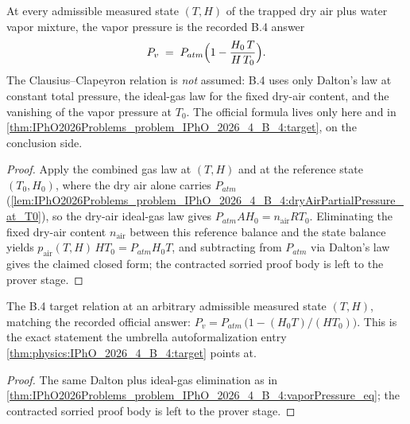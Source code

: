 \begin{theorem}
\label{thm:IPhO2026Problems_problem_IPhO_2026_4_B_4:vaporPressure_eq}
At every admissible measured state $(T, H)$ of the trapped dry air plus
water vapor mixture, the vapor pressure is the recorded B.4 answer
\[ P_v \;=\; P_{atm}\Bigl(1 - \frac{H_0\,T}{H\,T_0}\Bigr). \]
The Clausius--Clapeyron relation is \emph{not} assumed: B.4 uses only
Dalton's law at constant total pressure, the ideal-gas law for the fixed
dry-air content, and the vanishing of the vapor pressure at $T_0$.  The
official formula lives only here and in
\cref{thm:IPhO2026Problems_problem_IPhO_2026_4_B_4:target}, on the
conclusion side.
\end{theorem}
\begin{proof}
Apply the combined gas law at $(T, H)$ and at the reference state
$(T_0, H_0)$, where the dry air alone carries $P_{atm}$
(\cref{lem:IPhO2026Problems_problem_IPhO_2026_4_B_4:dryAirPartialPressure_at_T0}),
so the dry-air ideal-gas law gives
$P_{atm} A H_0 = n_{\mathrm{air}} R T_0$.  Eliminating the fixed dry-air
content $n_{\mathrm{air}}$ between this reference balance and the state
balance yields $p_{\mathrm{air}}(T,H)\,H T_0 = P_{atm} H_0 T$, and
subtracting from $P_{atm}$ via Dalton's law gives the claimed closed
form; the contracted sorried proof body is left to the prover stage.
\end{proof}

\begin{theorem}
\label{thm:IPhO2026Problems_problem_IPhO_2026_4_B_4:target}
The B.4 target relation at an arbitrary admissible measured state
$(T, H)$, matching the recorded official answer:
$P_v = P_{atm}\,\bigl(1 - (H_0 T)/(H T_0)\bigr)$.
This is the exact statement the umbrella autoformalization entry
\cref{thm:physics:IPhO_2026_4_B_4:target} points at.
\end{theorem}
\begin{proof}
The same Dalton plus ideal-gas elimination as in
\cref{thm:IPhO2026Problems_problem_IPhO_2026_4_B_4:vaporPressure_eq};
the contracted sorried proof body is left to the prover stage.
\end{proof}
